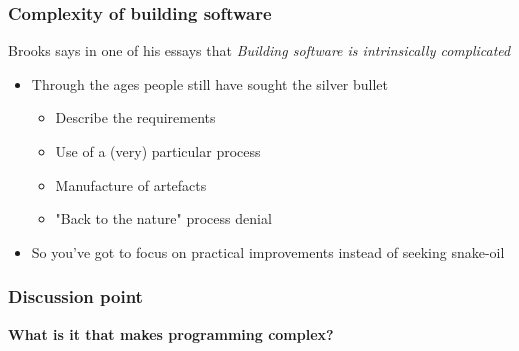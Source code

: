 \begin{frame}[fragile]
  \frametitle{Complexity of building software}
	Brooks says in one of his essays \citep{brooks1975mythical} that \emph{Building software is intrinsically complicated} 
  \begin{itemize}
	\item Through the ages people still have sought the silver bullet 
		  \begin{itemize}
		  	\item Describe the requirements
			\item Use of a (very) particular process
			\item Manufacture of artefacts
			\item "Back to the nature" process denial
		  \end{itemize}
	\item So you've got to focus on practical improvements instead of seeking snake-oil
  \end{itemize}
\end{frame}


\begin{frame}[fragile]
  \frametitle{Discussion point}
		\begin{center}
			\textbf{What is it that makes programming complex?}
		\end{center}
\end{frame}


